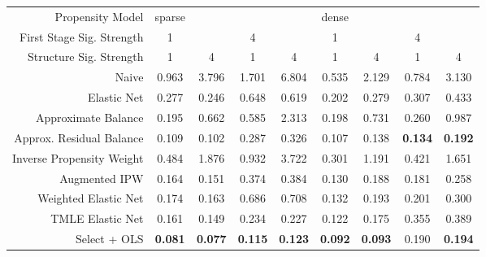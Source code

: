 \begin{table}[ht]
\centering
\begin{tabular}{|r|cc|cc|cc|cc|}
   \hline
Propensity Model & sparse &  &  &  & dense &  &  &  \\ 
  First Stage Sig. Strength & 1 &  & 4 &  & 1 &  & 4 &  \\ 
  Structure Sig. Strength & 1 & 4 & 1 & 4 & 1 & 4 & 1 & 4 \\ 
   \hline
Naive & 0.963 & 3.796 & 1.701 & 6.804 & 0.535 & 2.129 & 0.784 & 3.130 \\ 
  Elastic Net & 0.277 & 0.246 & 0.648 & 0.619 & 0.202 & 0.279 & 0.307 & 0.433 \\ 
   \hline
Approximate Balance & 0.195 & 0.662 & 0.585 & 2.313 & 0.198 & 0.731 & 0.260 & 0.987 \\ 
  Approx. Residual Balance & 0.109 & 0.102 & 0.287 & 0.326 & 0.107 & 0.138 &  \bf 0.134 &  \bf 0.192 \\ 
   \hline
Inverse Propensity Weight & 0.484 & 1.876 & 0.932 & 3.722 & 0.301 & 1.191 & 0.421 & 1.651 \\ 
  Augmented IPW & 0.164 & 0.151 & 0.374 & 0.384 & 0.130 & 0.188 & 0.181 & 0.258 \\ 
   \hline
Weighted Elastic Net & 0.174 & 0.163 & 0.686 & 0.708 & 0.132 & 0.193 & 0.201 & 0.300 \\ 
  TMLE Elastic Net & 0.161 & 0.149 & 0.234 & 0.227 & 0.122 & 0.175 & 0.355 & 0.389 \\ 
   \hline
Select + OLS &  \bf 0.081 &  \bf 0.077 &  \bf 0.115 &  \bf 0.123 &  \bf 0.092 &  \bf 0.093 & 0.190 &  \bf 0.194 \\ 
   \hline
\end{tabular}
\end{table}
